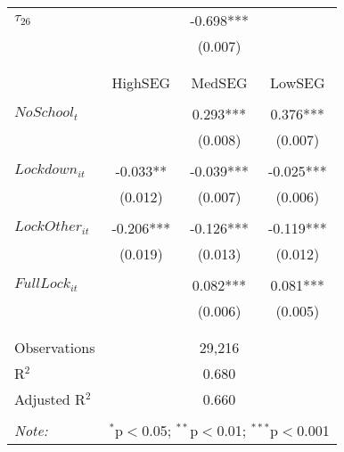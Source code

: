 \begin{tabular}{@{\extracolsep{-2pt}}lccc}
$\tau_{26}$ &      & -0.698*** &            \\
            &      &  (0.007)  &            \\
            &      &           &            \\[-2.1ex]
\cline{2-4} \\ [-1ex]      
                    &   HighSEG &    MedSEG &   LowSEG  \\\\[-.7ex]  
$NoSchool_t$        &           &  0.293*** &  0.376*** \\
                    &           &   (0.008) &   (0.007) \\
                    &           &           &           \\[-2.1ex]
$Lockdown_{it}$     & -0.033**  & -0.039*** & -0.025*** \\
                    &  (0.012)  &  (0.007)  &  (0.006)  \\
                    &           &           &           \\[-2.1ex]
$LockOther_{it}$    & -0.206*** & -0.126*** & -0.119*** \\
                    &  (0.019)  &  (0.013)  &  (0.012)  \\
                    &           &           &           \\[-2.1ex]
$FullLock_{it}$     &           &  0.082*** &  0.081*** \\
                    &           &   (0.006) &   (0.005) \\
                    &           &           &           \\[-2.1ex]
\hline \\[-1.8ex] 
Observations     & \multicolumn{3}{c}{29,216}  \\ 
R$^{2}$          & \multicolumn{3}{c}{ 0.680}  \\ 
Adjusted R$^{2}$ & \multicolumn{3}{c}{ 0.660}  \\ 
\hline 
\hline \\[-1.8ex] 
\textit{Note:}  & \multicolumn{3}{r}{$^{*}$p$<$0.05; $^{**}$p$<$0.01; $^{***}$p$<$0.001} \\ 
\end{tabular} 


% 
